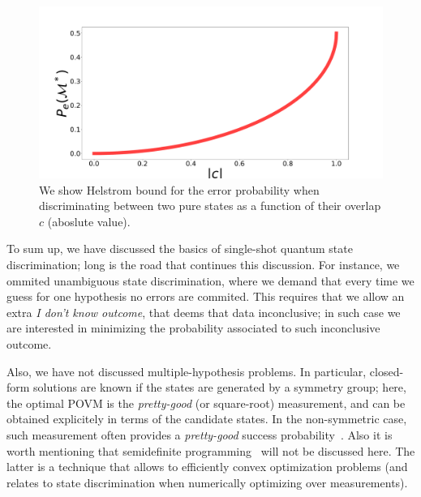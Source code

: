 \begin{figure}[t!]
    \centering
    \includegraphics[width=1.\textwidth]{Figures/117/helstrom.pdf}
    \caption{We show Helstrom bound for the error probability when discriminating between two pure states as a function of their overlap $c$ (aboslute value).}
    \label{fig:helpure}
\end{figure}

To sum up, we have discussed the basics of single-shot quantum state discrimination; long is the road that continues this discussion. For instance, we ommited unambiguous state discrimination, where we demand that every time we guess for one hypothesis no errors are commited. This requires that we allow an extra \textit{I don't know outcome}, that deems that data inconclusive; in such case we are interested in minimizing the probability associated to such inconclusive outcome.

Also, we have not discussed multiple-hypothesis problems. In particular, closed-form solutions are known if the states are generated by a symmetry group; here, the optimal POVM is the \textit{pretty-good} (or square-root) measurement, and can be obtained explicitely in terms of the candidate states. In the non-symmetric case, such measurement often provides a \textit{pretty-good} success probability~\cite{Wooters1994prettygood, CrokeReviewQSD}. Also it is worth mentioning that semidefinite programming~\cite{boyd} will not be discussed here. The latter is a technique that allows to efficiently convex optimization problems (and relates to state discrimination when numerically optimizing over measurements).

%



